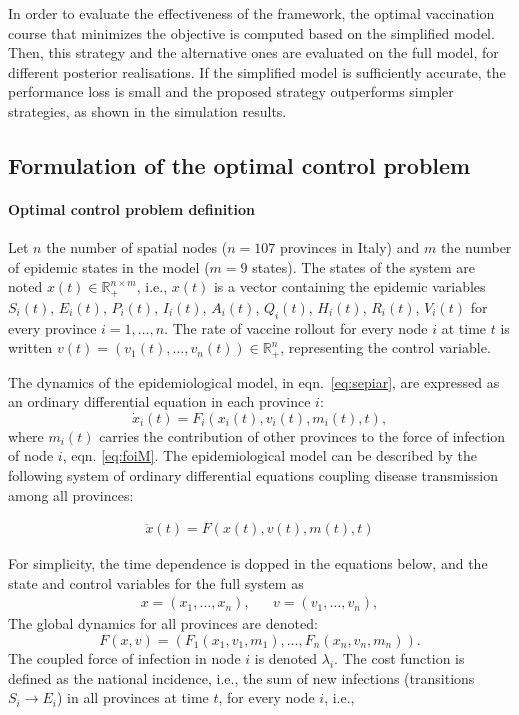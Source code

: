 In order to evaluate the effectiveness of the framework, the optimal vaccination course that minimizes the objective is computed based on the simplified model. Then, this strategy and the alternative ones are evaluated on the full model, for different posterior realisations. If the simplified model is sufficiently accurate, the performance loss is small and the proposed strategy outperforms simpler strategies, as shown in the simulation results.

\subsection{Formulation of the optimal control problem}
\paragraph{Optimal control problem definition}Let $n$ the number of spatial nodes ($n=107$ provinces in Italy) and $m$ the number of epidemic states in the model ($m=9$ states).
The states of the system are noted $x(t) \in \mathbb{R}_+^{n\times m}$, i.e., $x(t)$ is a vector containing the epidemic variables $S_i(t)$, $E_i(t)$, $P_i(t)$, $I_i(t)$, $A_i(t)$, $Q_i(t)$, $H_i(t)$, $R_i(t)$, $V_i(t)$ for every province $i=1,...,n$. The rate of vaccine rollout for every node $i$ at time $t$ is written $v(t) = (v_1(t),...,v_n(t)) \in \mathbb{R}_+^{n}$, representing the control variable. %

The dynamics of the epidemiological model, in eqn.~\eqref{eq:sepiar}, are expressed as an ordinary differential equation in each province $i$:
\begin{equation}
    \label{eq:sepiar_compact}
    \dot x_i(t) = F_i(x_i(t),v_i(t), m_i(t), t),
\end{equation}
where $m_i(t)$ carries the contribution of other provinces to the force of infection of node $i$, \ie eqn. \eqref{eq:foiM}. The epidemiological model can be described by the following system of ordinary differential equations coupling disease transmission among all provinces:

\begin{align}
    \dot x(t) = F(x(t),v(t),m(t),t)
    \label{eq:dynamics}
\end{align}

For simplicity, the time dependence is dopped in the equations below, and the state and control variables for the full system as
\begin{align*}
    x = (x_1,\ldots,x_n), && v = (v_1,\ldots,v_n),
\end{align*}
The global dynamics for all provinces are denoted:
\begin{equation*}
    F(x,v) = (F_1(x_1,v_1, m_1),\ldots,F_n(x_n,v_n, m_n)).
\end{equation*}
The coupled force of infection in node $i$ is denoted $\lambda_i$. The cost function is defined as the national incidence, i.e., the sum of new infections (transitions $S_i\longrightarrow E_i$) in all provinces at time $t$,  for every node $i$, i.e.,

